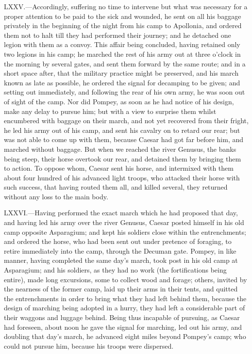 LXXV.—Accordingly, suffering no time to intervene but what was
necessary for a proper attention to be paid to the sick and wounded, he
sent on all his baggage privately in the beginning of the night from his
camp to Apollonia, and ordered them not to halt till they had performed
their journey; and he detached one legion with them as a convoy. This
affair being concluded, having retained only two legions in his camp; he
marched the rest of his army out at three o'clock in the morning by
several gates, and sent them forward by the same route; and in a short
space after, that the military practice might be preserved, and his
march known as late as possible, he ordered the signal for decamping to
be given; and setting out immediately, and following the rear of his own
army, he was soon out of sight of the camp. Nor did Pompey, as soon as
he had notice of his design, make any delay to pursue him; but with a
view to surprise them whilst encumbered with baggage on their march, and
not yet recovered from their fright, he led his army out of his camp,
and sent his cavalry on to retard our rear; but was not able to come up
with them, because Caesar had got far before him, and marched without
baggage. But when we reached the river Genusus, the banks being steep,
their horse overtook our rear, and detained them by bringing them to
action. To oppose whom, Caesar sent his horse, and intermixed with them
about four hundred of his advanced light troops, who attacked their
horse with such success, that having routed them all, and killed
several, they returned without any loss to the main body.

LXXVI.—Having performed the exact march which he had proposed that day,
and having led his army over the river Genusus, Caesar posted himself in
his old camp opposite Asparagium; and kept his soldiers close within the
entrenchments; and ordered the horse, who had been sent out under
pretence of foraging, to retire immediately into the camp, through the
Decuman gate. Pompey, in like manner, having completed the same day's
march, took post in his old camp at Asparagium; and his soldiers, as
they had no work (the fortifications being entire), made long
excursions, some to collect wood and forage; others, invited by the
nearness of the former camp, laid up their arms in their tents, and
quitted the entrenchments in order to bring what they had left behind
them, because the design of marching being adopted in a hurry, they had
left a considerable part of their waggons and luggage behind. Being thus
incapable of pursuing, as Caesar had foreseen, about noon he gave the
signal for marching, led out his army, and doubling that day's march, he
advanced eight miles beyond Pompey's camp; who could not pursue him,
because his troops were dispersed.

